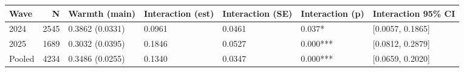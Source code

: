 
\begin{tabular}[t]{lrlllll}
\toprule
Wave & N & Warmth (main) & Interaction (est) & Interaction (SE) & Interaction (p) & Interaction 95\% CI\\
\midrule
2024 & 2545 & 0.3862 (0.0331) & 0.0961 & 0.0461 & 0.037* & {}[0.0057, 0.1865]\\
2025 & 1689 & 0.3032 (0.0395) & 0.1846 & 0.0527 & 0.000*** & {}[0.0812, 0.2879]\\
Pooled & 4234 & 0.3486 (0.0255) & 0.1340 & 0.0347 & 0.000*** & {}[0.0659, 0.2020]\\
\bottomrule
\end{tabular}

